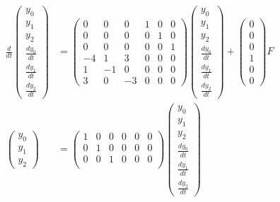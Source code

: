 \documentclass[a4paper,11pt,fleqn]{jreport}
\begin{document}
\begin{align}
 \frac{d}{dt} \left(\begin{array}{c}
	         y_0 \\
		     y_1 \\
		     y_2 \\
		     \frac{dy_0}{dt} \\
		     \frac{dy_1}{dt} \\
		     \frac{dy_2}{dt}
		    \end{array}\right)
 &=
 \left(\begin{array}{rrrrrr}
        0 & 0 & 0 & 1 & 0 & 0      \\
        0 & 0 & 0 & 0 & 1 & 0      \\
        0 & 0 & 0 & 0 & 0 & 1      \\
	-4& 1 & 3 & 0 & 0 & 0 \\
	1 & -1& 0 & 0 & 0 & 0 \\
	3 & 0 & -3& 0 & 0 & 0 
       \end{array}\right)
 \left(\begin{array}{c}
	         y_0 \\
		     y_1 \\
		     y_2 \\
		     \frac{dy_0}{dt} \\
		     \frac{dy_1}{dt} \\
		     \frac{dy_2}{dt}
       \end{array}\right)
 +
 \left(\begin{array}{c}
        0 \\
        0 \\
        0 \\
	    1 \\
	    0 \\
	    0 
       \end{array}\right)
        F
\nonumber
\\
 \left(\begin{array}{c}
	    y_0 \\
		y_1 \\
		y_2
       \end{array}\right)
 &=
 \left(\begin{array}{rrrrrr}
         1 & 0 & 0 & 0 & 0 & 0  \\
         0 & 1 & 0 & 0 & 0 & 0 \\
         0 & 0 & 1 & 0 & 0 & 0 \\
       \end{array}\right)
 \left(\begin{array}{c}
	         y_0 \\
		     y_1 \\
		     y_2 \\
		     \frac{dy_0}{dt} \\
		     \frac{dy_1}{dt} \\
		     \frac{dy_2}{dt}
       \end{array}\right)
\nonumber
\end{align}
\end{document}
